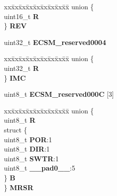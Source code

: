 \begin{DoxyCompactItemize}
\begin{tabbing}
\end{tabbing}\item 
\mbox{\label{structECSM__tag_aa41e2e361adc8369c37434b067640bb6}} 
\begin{tabbing}
xx\=xx\=xx\=xx\=xx\=xx\=xx\=xx\=xx\=\kill
union \{\\
\>uint16\_t {\bfseries R}\\
\} {\bfseries REV}\\

\end{tabbing}\item 
\mbox{\label{structECSM__tag_a343b304a475bacf6c8f3f111b5ef0797}} 
uint32\+\_\+t {\bfseries E\+C\+S\+M\+\_\+reserved0004}
\item 
\mbox{\label{structECSM__tag_a0b7e2d0f7c230fc753e40644216cfcdd}} 
\begin{tabbing}
xx\=xx\=xx\=xx\=xx\=xx\=xx\=xx\=xx\=\kill
union \{\\
\>uint32\_t {\bfseries R}\\
\} {\bfseries IMC}\\

\end{tabbing}\item 
\mbox{\label{structECSM__tag_a88b1cda49acc1eaeb73e102cb6614d33}} 
uint8\+\_\+t {\bfseries E\+C\+S\+M\+\_\+reserved000C} \mbox{[}3\mbox{]}
\item 
\mbox{\label{structECSM__tag_ab23b1284e34cd79de4349366a6f990e2}} 
\begin{tabbing}
xx\=xx\=xx\=xx\=xx\=xx\=xx\=xx\=xx\=\kill
union \{\\
\>uint8\_t {\bfseries R}\\
\>struct \{\\
\>\>uint8\_t {\bfseries POR}:1\\
\>\>uint8\_t {\bfseries DIR}:1\\
\>\>uint8\_t {\bfseries SWTR}:1\\
\>\>uint8\_t {\bfseries \_\_pad0\_\_}:5\\
\>\} {\bfseries B}\\
\} {\bfseries MRSR}\\


\end{tabbing}
\end{DoxyCompactItemize}
